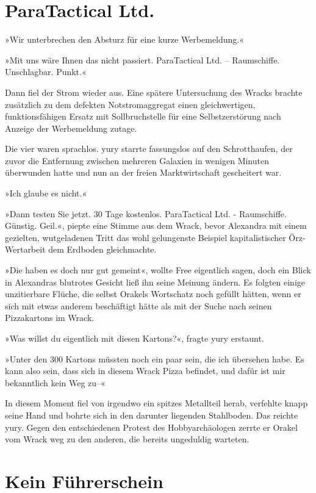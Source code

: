 \section{ParaTactical Ltd.}

»Wir unterbrechen den Absturz für eine kurze Werbemeldung.«

»Mit uns wäre Ihnen das nicht passiert. ParaTactical Ltd. – Raumschiffe. Unschlagbar. Punkt.«

Dann fiel der Strom wieder aus. Eine spätere Untersuchung des Wracks brachte zusätzlich zu dem defekten Notstromaggregat einen gleichwertigen, funktionsfähigen Ersatz mit Sollbruchstelle für eine Selbstzerstörung nach Anzeige der Werbemeldung zutage.

Die vier waren sprachlos. yury starrte fassungslos auf den Schrotthaufen, der zuvor die Entfernung zwischen mehreren Galaxien in wenigen Minuten überwunden hatte und nun an der freien Marktwirtschaft gescheitert war.

»Ich glaube es nicht.«

»Dann testen Sie jetzt. 30 Tage kostenlos. ParaTactical Ltd. - Raumschiffe. Günstig. Geil.«, piepte eine Stimme aus dem Wrack, bevor Alexandra mit einem gezielten, wutgeladenen Tritt das wohl gelungenste Beispiel kapitalistischer Örz-Wertarbeit dem Erdboden gleichmachte.

»Die haben es doch nur gut gemeint«, wollte Free eigentlich sagen, doch ein Blick in Alexandras blutrotes Gesicht ließ ihn seine Meinung ändern. Es folgten einige unzitierbare Flüche, die selbst Orakels Wortschatz noch gefüllt hätten, wenn er sich mit etwas anderem beschäftigt hätte als mit der Suche nach seinen Pizzakartons im Wrack.

»Was willst du eigentlich mit diesen Kartons?«, fragte yury erstaunt.

»Unter den 300 Kartons müssten noch ein paar sein, die ich übersehen habe. Es kann also sein, dass sich in diesem Wrack Pizza befindet, und dafür ist mir bekanntlich kein Weg zu–«

In diesem Moment fiel von irgendwo ein spitzes Metallteil herab, verfehlte knapp seine Hand und bohrte sich in den darunter liegenden Stahlboden. Das reichte yury. Gegen den entschiedenen Protest des Hobbyarchäologen zerrte er Orakel vom Wrack weg zu den anderen, die bereits ungeduldig warteten.


\section{Kein Führerschein}

